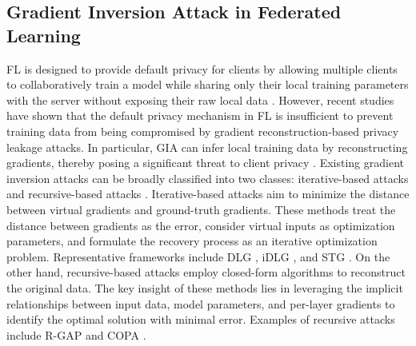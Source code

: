 \subsection{Gradient Inversion Attack in Federated Learning}
FL is designed to provide default privacy for clients by allowing multiple clients to collaboratively train a model while sharing only their local training parameters with the server without exposing their raw local data \cite{xue2024differentially}. However, recent studies have shown that the default privacy mechanism in FL is insufficient to prevent training data from being compromised by gradient reconstruction-based privacy leakage attacks. In particular, GIA can infer local training data by reconstructing gradients, thereby posing a significant threat to client privacy \cite{sun2024client}.
Existing gradient inversion attacks can be broadly classified into two classes: iterative-based attacks and recursive-based attacks \cite{ovi2023comprehensive}. Iterative-based attacks aim to minimize the distance between virtual gradients and ground-truth gradients. These methods treat the distance between gradients as the error, consider virtual inputs as optimization parameters, and formulate the recovery process as an iterative optimization problem. Representative frameworks include DLG \cite{zhu2019deep}, iDLG \cite{zhao2020idlg}, and STG \cite{yin2021see}. On the other hand, recursive-based attacks employ closed-form algorithms to reconstruct the original data. The key insight of these methods lies in leveraging the implicit relationships between input data, model parameters, and per-layer gradients to identify the optimal solution with minimal error. Examples of recursive attacks include R-GAP \cite{zhu2020r} and COPA \cite{chen2021understanding}.

